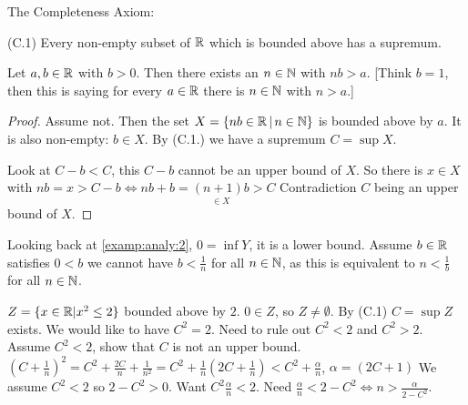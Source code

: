 \documentclass[10pt, a4paper]{article}
\begin{document}
The Completeness Axiom:

(C.1) Every non-empty subset of $\mathbb{R}$ which is bounded above has a supremum.

\begin{theorem}[Archimedes]\label{analy:thm:archim}
    Let $a, b \in \mathbb{R}$ with $b > 0$. Then there exists an $n \in \mathbb{N}$ with $nb > a$.
    [Think $b = 1$, then this is saying for every $a \in \mathbb{R}$ there is $n \in \mathbb{N}$ with $n > a$.]
    \begin{proof}
        Assume not.
        Then the set $X = \{nb \in \mathbb{R} \,|\, n \in \mathbb{N}\}$ is bounded above by $a$.
        It is also non-empty:
        $b \in X$.
        By (C.1.) we have a supremum $C = \sup X$.

        Look at $C - b < C$,
        this $C - b$ cannot be an upper bound of $X$.
        So there is $x \in X$ with $nb = x > C - b \iff nb + b = \underset{\in X}{(n + 1)b} > C$
        Contradiction $C$ being an upper bound of $X$.
    \end{proof}
\end{theorem}

Looking back at \autoref{examp:analy:2},
$0 = \inf Y$,
it is a lower bound.
Assume $b \in \mathbb{R}$ satisfies $0 < b$ we cannot have $b < \frac{1}{n}$ for all $n \in \mathbb{N}$,
as this is equivalent to $n < \frac{1}{b}$ for all $n \in \mathbb{N}$.

\begin{example}
    $Z = \{x \in \mathbb{R} | x ^ 2 \leq 2\}$
    bounded above by $2$.
    $0 \in Z$, so $Z \neq \emptyset$.
    By (C.1) $C = \sup Z$ exists.
    We would like to have $C ^ 2 = 2$.
    Need to rule out $C ^ 2 < 2$ and $C ^ 2 > 2$.
    Assume $C ^ 2 < 2$,
    show that $C$ is not an upper bound.
    $\left(C + \frac{1}{n}\right) ^ 2 = C ^ 2 + \frac{2C}{n}+ \frac{1}{n ^ 2} = C ^ 2 + \frac{1}{n}\left(2C + \frac{1}{n}\right) < C ^ 2 + \frac{\alpha}{n}$, $\alpha = \left(2C + 1\right)$
    We assume $C ^ 2 < 2$ so $2 - C ^ 2 > 0$.
    Want $C ^ 2 \frac{\alpha}{n} < 2$.
    Need $\frac{\alpha}{n} < 2 - C ^ 2 \iff n > \frac{\alpha}{2 - C ^ 2}$.
\end{example}
\end{document}
